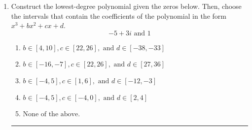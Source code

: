 \documentclass[14pt]{extbook}
\newcommand{\litem}[1]{\item#1\hspace*{-1cm}\rule{\textwidth}{0.4pt}}
\begin{document}
\begin{enumerate}
{\begin{enumerate}[label=\Alph*.]
\end{enumerate} }
\litem{
Construct the lowest-degree polynomial given the zeros below. Then, choose the intervals that contain the coefficients of the polynomial in the form $x^3+bx^2+cx+d$.\[ -5 + 3 i \text{ and } 1 \]\begin{enumerate}[label=\Alph*.]
\item \( b \in [4, 10], c \in [22, 26], \text{ and } d \in [-38, -33] \)
\item \( b \in [-16, -7], c \in [22, 26], \text{ and } d \in [27, 36] \)
\item \( b \in [-4, 5], c \in [1, 6], \text{ and } d \in [-12, -3] \)
\item \( b \in [-4, 5], c \in [-4, 0], \text{ and } d \in [2, 4] \)
\item \( \text{None of the above.} \)


\end{enumerate}}
\end{enumerate}
\end{document}
